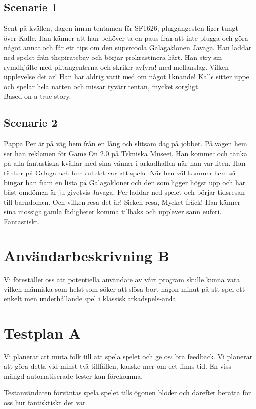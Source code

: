 \documentclass[a4paper,11pt]{article}
\begin{document}
\subsection{Scenarie 1}
Sent på kvällen, dagen innan tentamen för SF1626, pluggångesten liger tungt över Kalle. Han känner att han behöver ta en paus från att inte plugga och göra något annat och får ett tips om den supercoola Galagaklonen Javaga. Han laddar ned spelet från thepiratebay och börjar prokrastinera hårt. Han stry sin rymdhjälte med piltangenterna och skriker avfyra! med mellanslag. Vilken upplevelse det är! Han har aldrig varit med om något liknande! Kalle sitter uppe och spelar hela natten och missar tyvärr tentan, mycket sorgligt. \\

\noindent
Based on a true story.

\subsection{Scenarie 2}
Pappa Per är på väg hem från en lång och slitsam dag på jobbet. På vägen hem ser han reklamen för Game On 2.0 på Tekniska Museet. Han kommer och tänka på alla fantastiska kvällar med sina vänner i arkadhallen när han var liten. Han tänker på Galaga och hur kul det var att spela. När han väl kommer hem så bingar han fram en lista på Galagakloner och den som ligger högst upp och har bäst omdömen är ju givetvis Javaga. Per laddar ned spelet och börjar tidsresan till barndomen. Och vilken resa det är! Sicken resa, Mycket fräck! Han känner sina mossiga gamla fädigheter komma tillbaks och upplever sann eufori. Fantastiskt.

\section{Användarbeskrivning B}
Vi föreställer oss att potentiella användare av vårt program skulle kunna vara vilken människa som helst som söker att slösa bort någon minut på att spel ett enkelt men underhållande spel i klassisk arkadspels-anda

\section{Testplan A}
Vi planerar att muta folk till att spela spelet och ge oss bra feedback. Vi planerar att göra detta vid minst två tillfällen, kanske mer om det finns tid. En viss mängd automatiserade tester kan förekomma.

Testanvändaren förväntas spela spelet tills ögonen blöder och därefter berätta för oss hur fantisktiskt det var. 
\end{document}
